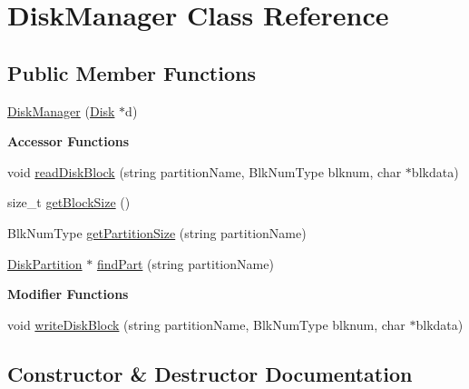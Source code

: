 \hypertarget{classDiskManager}{}\section{Disk\+Manager Class Reference}
\label{classDiskManager}
\subsection*{Public Member Functions}
\begin{DoxyCompactItemize}
\item 
\hyperlink{classDiskManager_a948cecec230d9895bafaced5534fd6cf}{Disk\+Manager} (\hyperlink{classDisk}{Disk} $\ast$d)
\end{DoxyCompactItemize}
\begin{Indent}{\bf Accessor Functions}\par
\begin{DoxyCompactItemize}
\item 
void \hyperlink{classDiskManager_afda24be04fb85711236a4d5905a5ad1c}{read\+Disk\+Block} (string partition\+Name, Blk\+Num\+Type blknum, char $\ast$blkdata)
\item 
size\+\_\+t \hyperlink{classDiskManager_aabdfbb2171f3c19a3ae14f9532876404}{get\+Block\+Size} ()
\item 
Blk\+Num\+Type \hyperlink{classDiskManager_ae32627ccfa72013e35da637570e1729b}{get\+Partition\+Size} (string partition\+Name)
\item 
\hyperlink{structDiskPartition}{Disk\+Partition} $\ast$ \hyperlink{classDiskManager_a08375c254bc09c8351a4f96cb669f1ab}{find\+Part} (string partition\+Name)
\end{DoxyCompactItemize}
\end{Indent}
\begin{Indent}{\bf Modifier Functions}\par
\begin{DoxyCompactItemize}
\item 
void \hyperlink{classDiskManager_ac96846d309a59e8ac7b100724329cb30}{write\+Disk\+Block} (string partition\+Name, Blk\+Num\+Type blknum, char $\ast$blkdata)
\end{DoxyCompactItemize}
\end{Indent}


\subsection{Constructor \& Destructor Documentation}
